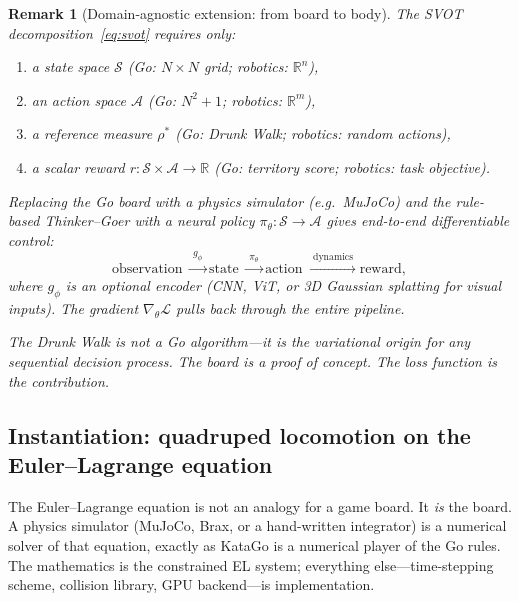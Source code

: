 \documentclass[11pt,a4paper]{article}
\newtheorem{remark}[theorem]{Remark}
\newcommand{\R}{\mathbb{R}}
\newcommand{\cL}{\mathcal{L}}
\newcommand{\cS}{\mathcal{S}}
\newcommand{\cA}{\mathcal{A}}
\begin{document}
\begin{remark}[Domain-agnostic extension:
  from board to body]%
\label{rem:domain-agnostic}
\color{black!60}%
The SVOT decomposition~\eqref{eq:svot} requires only:
\begin{enumerate}[label=\textup{(\roman*)}, nosep]
\item a state space $\cS$
  (Go: $N \times N$ grid;
   robotics: $\R^n$),
\item an action space $\cA$
  (Go: $N^2 + 1$;
   robotics: $\R^m$),
\item a reference measure $\rho^*$
  (Go: Drunk Walk;
   robotics: random actions),
\item a scalar reward
  $r : \cS \times \cA \to \R$
  (Go: territory score;
   robotics: task objective).
\end{enumerate}
Replacing the Go board with a physics simulator
(e.g.\ MuJoCo) and the rule-based Thinker--Goer
with a neural policy
$\pi_\theta : \cS \to \cA$ gives end-to-end
differentiable control:
\[
  \text{observation}
  \;\xrightarrow{\;g_\phi\;}
  \text{state}
  \;\xrightarrow{\;\pi_\theta\;}
  \text{action}
  \;\xrightarrow{\;\text{dynamics}\;}
  \text{reward},
\]
where $g_\phi$ is an optional encoder
(CNN, ViT, or 3D Gaussian splatting for visual inputs).
The gradient $\nabla_\theta \cL$ pulls back through
the entire pipeline.

\medskip\noindent
The Drunk Walk is not a Go algorithm---it is the
\emph{variational origin} for any sequential decision
process.
The board is a proof of concept.
The loss function is the contribution.
\end{remark}


\subsection{Instantiation: quadruped locomotion on the Euler--Lagrange equation}
\label{sec:locomotion}

The Euler--Lagrange equation is not an analogy for a game board.
It \emph{is} the board.
A physics simulator (MuJoCo, Brax, or a hand-written integrator)
is a numerical solver of that equation,
exactly as KataGo is a numerical player of the Go rules.
The mathematics is the constrained EL system;
everything else---time-stepping scheme, collision library,
GPU backend---is implementation.
\end{document}
